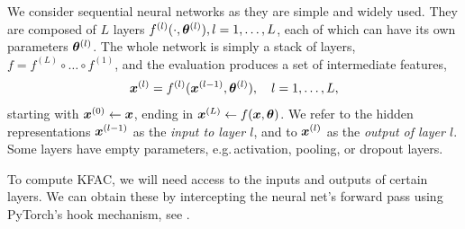 We consider sequential neural networks as they are simple and widely used.
They are composed of $L$ layers $f^{(l)}(\cdot, {\bm{\theta}}^{(l)}), l=1,\dots, L$, each of which can have its own parameters ${\bm{\theta}}^{(l)}$.
The whole network is simply a stack of layers, \ie $f = f^{(L)} \circ \dots \circ f^{(1)}$, and the evaluation produces a set of intermediate features,
\begin{align*}
  {\bm{x}}^{(l)} = f^{(l)}({\bm{x}}^{(l-1)}, {\bm{\theta}}^{(l)}), \quad l=1,\dots, L,
\end{align*}
starting with ${\bm{x}}^{(0)} \leftarrow {\bm{x}}$, ending in ${\bm{x}}^{(L)} \leftarrow f({\bm{x}}, {\bm{\theta}})$.
We refer to the hidden representations ${\bm{x}}^{(l-1)}$ as the \emph{input to layer $l$}, and to ${\bm{x}}^{(l)}$ as the \emph{output of layer $l$}.
Some layers have empty parameters, e.g.\,activation, pooling, or dropout layers.

To compute KFAC, we will need access to the inputs and outputs of certain layers.
We can obtain these by intercepting the neural net's forward pass using PyTorch's hook mechanism, see .
